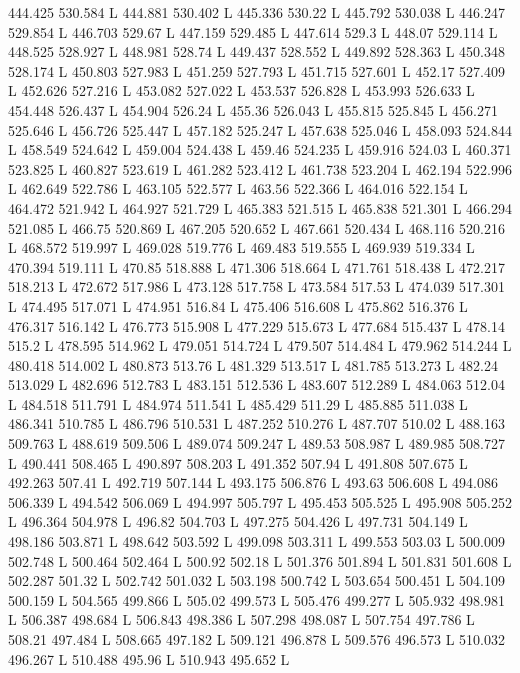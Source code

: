 444.425 530.584 L
444.881 530.402 L
445.336 530.22 L
445.792 530.038 L
446.247 529.854 L
446.703 529.67 L
447.159 529.485 L
447.614 529.3 L
448.07 529.114 L
448.525 528.927 L
448.981 528.74 L
449.437 528.552 L
449.892 528.363 L
450.348 528.174 L
450.803 527.983 L
451.259 527.793 L
451.715 527.601 L
452.17 527.409 L
452.626 527.216 L
453.082 527.022 L
453.537 526.828 L
453.993 526.633 L
454.448 526.437 L
454.904 526.24 L
455.36 526.043 L
455.815 525.845 L
456.271 525.646 L
456.726 525.447 L
457.182 525.247 L
457.638 525.046 L
458.093 524.844 L
458.549 524.642 L
459.004 524.438 L
459.46 524.235 L
459.916 524.03 L
460.371 523.825 L
460.827 523.619 L
461.282 523.412 L
461.738 523.204 L
462.194 522.996 L
462.649 522.786 L
463.105 522.577 L
463.56 522.366 L
464.016 522.154 L
464.472 521.942 L
464.927 521.729 L
465.383 521.515 L
465.838 521.301 L
466.294 521.085 L
466.75 520.869 L
467.205 520.652 L
467.661 520.434 L
468.116 520.216 L
468.572 519.997 L
469.028 519.776 L
469.483 519.555 L
469.939 519.334 L
470.394 519.111 L
470.85 518.888 L
471.306 518.664 L
471.761 518.438 L
472.217 518.213 L
472.672 517.986 L
473.128 517.758 L
473.584 517.53 L
474.039 517.301 L
474.495 517.071 L
474.951 516.84 L
475.406 516.608 L
475.862 516.376 L
476.317 516.142 L
476.773 515.908 L
477.229 515.673 L
477.684 515.437 L
478.14 515.2 L
478.595 514.962 L
479.051 514.724 L
479.507 514.484 L
479.962 514.244 L
480.418 514.002 L
480.873 513.76 L
481.329 513.517 L
481.785 513.273 L
482.24 513.029 L
482.696 512.783 L
483.151 512.536 L
483.607 512.289 L
484.063 512.04 L
484.518 511.791 L
484.974 511.541 L
485.429 511.29 L
485.885 511.038 L
486.341 510.785 L
486.796 510.531 L
487.252 510.276 L
487.707 510.02 L
488.163 509.763 L
488.619 509.506 L
489.074 509.247 L
489.53 508.987 L
489.985 508.727 L
490.441 508.465 L
490.897 508.203 L
491.352 507.94 L
491.808 507.675 L
492.263 507.41 L
492.719 507.144 L
493.175 506.876 L
493.63 506.608 L
494.086 506.339 L
494.542 506.069 L
494.997 505.797 L
495.453 505.525 L
495.908 505.252 L
496.364 504.978 L
496.82 504.703 L
497.275 504.426 L
497.731 504.149 L
498.186 503.871 L
498.642 503.592 L
499.098 503.311 L
499.553 503.03 L
500.009 502.748 L
500.464 502.464 L
500.92 502.18 L
501.376 501.894 L
501.831 501.608 L
502.287 501.32 L
502.742 501.032 L
503.198 500.742 L
503.654 500.451 L
504.109 500.159 L
504.565 499.866 L
505.02 499.573 L
505.476 499.277 L
505.932 498.981 L
506.387 498.684 L
506.843 498.386 L
507.298 498.087 L
507.754 497.786 L
508.21 497.484 L
508.665 497.182 L
509.121 496.878 L
509.576 496.573 L
510.032 496.267 L
510.488 495.96 L
510.943 495.652 L
